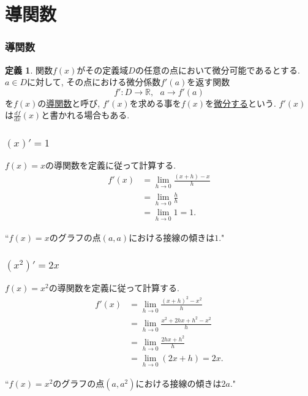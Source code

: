 \documentclass[dvipdfmx,cjk,10.2pt]{beamer}
\newcommand{\R}{\mathbb{R}}
\theoremstyle{definition}
\newtheorem{Def}[Thm]{定義}
\begin{document}
\section{導関数}

\begin{frame}
\frametitle{導関数}


\begin{Def}
関数$f(x)$がその定義域$D$の任意の点において微分可能であるとする. 
$a \in D$に対して, その点における微分係数$f'(a)$を返す関数
$$
f':D \longrightarrow \R, \ \ \ a \to f'(a)
$$
を$f(x)$の\underline{導関数}と呼び, $f'(x)$を求める事を$f(x)$を\underline{微分する}という.  
$f'(x)$は$\frac{df}{dx}(x)$と書かれる場合もある. 
\end{Def}

\end{frame}




\begin{frame}
\frametitle{$(x)'=1$}


$f(x)=x$の導関数を定義に従って計算する. 
\begin{align*}
f'(x) & = \lim_{h\to 0} \frac{(x+h)-x}{h} \\
& =  \lim_{h\to 0} \frac{h}{h} \\
& =  \lim_{h\to 0} 1=1. 
\end{align*}

``$f(x)=x$のグラフの点$(a,a)$における接線の傾きは$1$." 

\end{frame}




\begin{frame}
\frametitle{$(x^2)'=2x$}


$f(x)=x^2$の導関数を定義に従って計算する. 
\begin{align*}
f'(x) & = \lim_{h\to 0} \frac{(x+h)^2-x^2}{h} \\
& =  \lim_{h\to 0} \frac{x^2+2hx+h^2-x^2}{h} \\
& =  \lim_{h\to 0} \frac{2hx+h^2}{h} \\
& =  \lim_{h\to 0} (2x+h) =2x. 
\end{align*}

``$f(x)=x^2$のグラフの点$(a,a^2)$における接線の傾きは$2a$." 

\end{frame}
\end{document}

